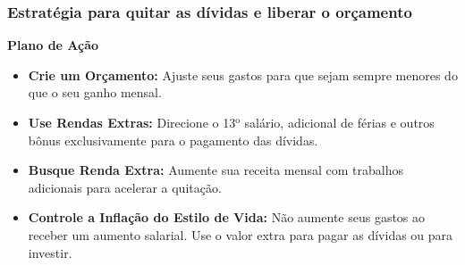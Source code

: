 \begin{frame}[c]\frametitle{Estratégia para quitar as dívidas e liberar o orçamento}
    \textbf{Plano de Ação}
    \begin{itemize}
        \item \textbf{Crie um Orçamento:} Ajuste seus gastos para que sejam sempre menores do que o seu ganho mensal.
        \item \textbf{Use Rendas Extras:} Direcione o 13$^\text{o}$ salário, adicional de férias e outros bônus exclusivamente para o pagamento das dívidas.
        \item \textbf{Busque Renda Extra:} Aumente sua receita mensal com trabalhos adicionais para acelerar a quitação.
        \item \textbf{Controle a Inflação do Estilo de Vida:} Não aumente seus gastos ao receber um aumento salarial. Use o valor extra para pagar as dívidas ou para investir.
    \end{itemize}
\end{frame}